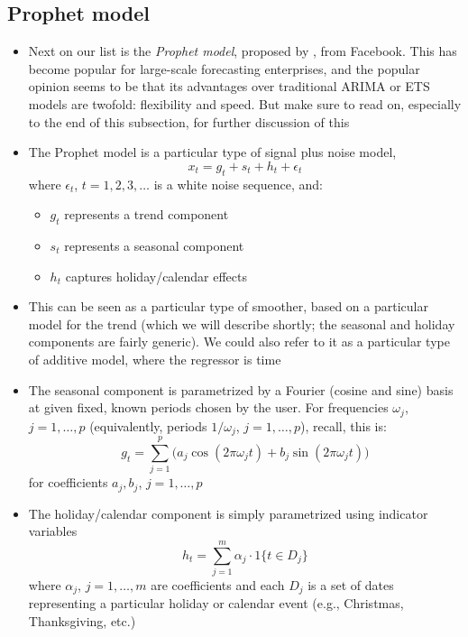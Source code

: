 \documentclass{article}
\begin{document}
\subsection{Prophet model}

\begin{itemize}
\item Next on our list is the \emph{Prophet model}, proposed by
  \citet{taylor2018forecasting}, from Facebook. This has become popular for
  large-scale forecasting enterprises, and the popular opinion seems to be that
  its advantages over traditional ARIMA or ETS models are twofold: flexibility
  and speed. But make sure to read on, especially to the end of this subsection,
  for further discussion of this 

\item The Prophet model is a particular type of signal plus noise model, 
  \[
  x_t = g_t + s_t + h_t + \epsilon_t
  \]
  where $\epsilon_t$, $t = 1,2,3,\dots$ is a white noise sequence, and:
  \begin{itemize}
  \item $g_t$ represents a trend component
  \item $s_t$ represents a seasonal component
  \item $h_t$ captures holiday/calendar effects 
  \end{itemize}

\item This can be seen as a particular type of smoother, based on a particular
  model for the trend (which we will describe shortly; the seasonal and holiday
  components are fairly generic). We could also refer to it as a particular type
  of additive model, where the regressor is time

\item The seasonal component is parametrized by a Fourier (cosine and sine)
  basis at given fixed, known periods chosen by the user. For frequencies
  $\omega_j$, $j = 1,\dots,p$ (equivalently, periods $1/\omega_j$, $j =
  1,\dots,p$), recall, this is:  
  \[
  g_t = \sum_{j=1}^p \Big( a_j \cos(2\pi \omega_j t) + b_j \sin(2\pi \omega_j t)
  \Big) 
  \]
  for coefficients $a_j, b_j$, $j = 1,\dots,p$

\item The holiday/calendar component is simply parametrized using indicator
  variables 
  \[
  h_t = \sum_{j=1}^m \alpha_j \cdot 1\{ t \in D_j \}
  \]
  where $\alpha_j$, $j = 1,\dots,m$ are coefficients and each $D_j$ is a set of
  dates representing a particular holiday or calendar event (e.g., Christmas,
  Thanksgiving, etc.) 


\end{itemize}
\end{document}
